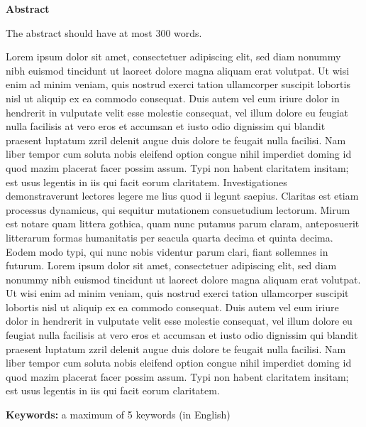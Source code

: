 \vspace*{2cm}
\begin{center}
\Large \bf Abstract
\end{center}
\vspace*{1cm} \setlength{\baselineskip}{0.6cm}

The abstract should have at most 300 words.


Lorem ipsum dolor sit amet, consectetuer adipiscing elit, sed diam nonummy nibh euismod tincidunt ut laoreet dolore magna aliquam erat volutpat. Ut wisi enim ad minim veniam, quis nostrud exerci tation ullamcorper suscipit lobortis nisl ut aliquip ex ea commodo consequat. Duis autem vel eum iriure dolor in hendrerit in vulputate velit esse molestie consequat, vel illum dolore eu feugiat nulla facilisis at vero eros et accumsan et iusto odio dignissim qui blandit praesent luptatum zzril delenit augue duis dolore te feugait nulla facilisi. Nam liber tempor cum soluta nobis eleifend option congue nihil imperdiet doming id quod mazim placerat facer possim assum. Typi non habent claritatem insitam; est usus legentis in iis qui facit eorum claritatem. Investigationes demonstraverunt lectores legere me lius quod ii legunt saepius. Claritas est etiam processus dynamicus, qui sequitur mutationem consuetudium lectorum. Mirum est notare quam littera gothica, quam nunc putamus parum claram, anteposuerit litterarum formas humanitatis per seacula quarta decima et quinta decima. Eodem modo typi, qui nunc nobis videntur parum clari, fiant sollemnes in futurum. Lorem ipsum dolor sit amet, consectetuer adipiscing elit, sed diam nonummy nibh euismod tincidunt ut laoreet dolore magna aliquam erat volutpat. Ut wisi enim ad minim veniam, quis nostrud exerci tation ullamcorper suscipit lobortis nisl ut aliquip ex ea commodo consequat. Duis autem vel eum iriure dolor in hendrerit in vulputate velit esse molestie consequat, vel illum dolore eu feugiat nulla facilisis at vero eros et accumsan et iusto odio dignissim qui blandit praesent luptatum zzril delenit augue duis dolore te feugait nulla facilisi. Nam liber tempor cum soluta nobis eleifend option congue nihil imperdiet doming id quod mazim placerat facer possim assum. Typi non habent claritatem insitam; est usus legentis in iis qui facit eorum claritatem.


\vfill

\begin{flushleft}
\textbf{Keywords:}
a maximum of 5 keywords (in English)
\end{flushleft}

\LIMPA


